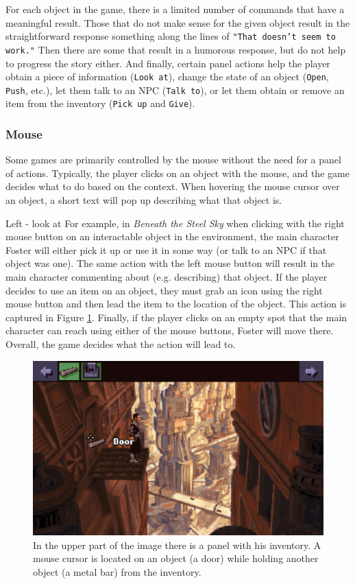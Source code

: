 For each object in the game, there is a limited number of commands that have a meaningful result. Those that do not make sense for the given object result in the straightforward response something along the lines of \texttt{"That doesn't seem to work."} Then there are some that result in a humorous response, but do not help to progress the story either. And finally, certain panel actions help the player obtain a piece of information (\texttt{Look at}), change the state of an object (\texttt{Open}, \texttt{Push}, etc.), let them talk to an NPC (\texttt{Talk to}), or let them obtain or remove an item from the inventory (\texttt{Pick up} and \texttt{Give}).

\subsubsection{Mouse}
Some games are primarily controlled by the mouse without the need for a panel of actions. Typically, the player clicks on an object with the mouse, and the game decides what to do based on the context. When hovering the mouse cursor over an object, a short text will pop up describing what that object is.

Left - look at
For example, in \textit{Beneath the Steel Sky} when clicking with the right mouse button on an interactable object in the environment, the main character Foster will either pick it up or use it in some way (or talk to an NPC if that object was one). The same action with the left mouse button will result in the main character commenting about (e.g. describing) that object. If the player decides to use an item on an object, they must grab an icon using the right mouse button and then lead the item to the location of the object. This action is captured in Figure \ref{fig:C-BaSS}. Finally, if the player clicks on an empty spot that the main character can reach using either of the mouse buttons, Foster will move there. Overall, the game decides what the action will lead to.

\begin{figure}[H]
\centering
\includegraphics[width=.8\linewidth]{img/C-BaSS.png}
\caption{In the upper part of the image there is a panel with his inventory. A mouse cursor is located on an object (a door) while holding another object (a metal bar) from the inventory.}
\label{fig:C-BaSS}
\end{figure}

